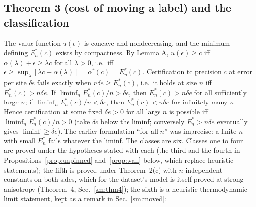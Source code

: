 \documentclass[aps,prx,onecolumn,10pt,nofootinbib,longbibliography,floatfix]{revtex4-2}
\theoremstyle{remark}
\newcommand{\de}{\delta e}
\begin{document}
\subsection{Theorem 3 (cost of moving a label) and the classification} %
The value function $u(\epsilon)$ is concave and nondecreasing, and the minimum defining $E^*_n(c)$ exists by
compactness. By Lemma A, $u(\epsilon)\ge c$ iff $\alpha(\lambda)+\epsilon\ge\lambda c$ for all $\lambda>0$, i.e.\ iff %
$\epsilon\ge\sup_\lambda[\lambda c-\alpha(\lambda)]=\alpha^*(c)=E^*_n(c)$. Certification to precision $c$ at error
per site $\de$ fails exactly when $n\de\ge E^*_n(c)$, i.e.\ it holds at size $n$ iff $E^*_n(c)>n\de$. If
$\liminf_nE^*_n(c)/n>\de$, then $E^*_n(c)>n\de$ for all sufficiently large $n$; if $\liminf_nE^*_n(c)/n<\de$,
then $E^*_n(c)<n\de$ for infinitely many $n$. Hence certification at some fixed $\de>0$ for all large $n$ is
possible iff $\liminf_nE^*_n(c)/n>0$ (take $\de$ below the liminf; conversely $E^*_n>n\de$ eventually gives
$\liminf\ge\de$). The earlier formulation ``for all $n$'' was imprecise: a finite $n$ with small $E^*_n$ fails
whatever the liminf. The classes are six. Classes one to four are proved under the hypotheses stated with each (the
third and the fourth in Propositions~\ref{prop:unpinned} and~\ref{prop:wall} below, which replace heuristic statements);
the fifth is proved under Theorem~2(c) with $n$-independent constants on both sides, which for the dataset's model %
is itself proved at strong anisotropy (Theorem~4, Sec.~\ref{sm:thm4}); the sixth is a heuristic thermodynamic-limit %
statement, kept as a remark in Sec.~\ref{sm:moved}:
\end{document}
